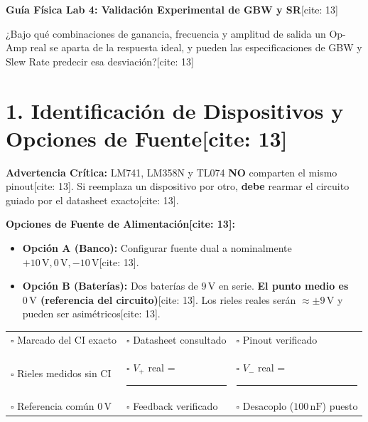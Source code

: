 \documentclass[11pt, a4paper]{article}
\begin{document}
\begin{center}
    \Large\textbf{\textcolor{ucbblue}{Guía Física Lab 4: Validación Experimental de GBW y SR}}[cite: 13]
\end{center}

\begin{tcolorbox}[colback=ucbblue!5, colframe=ucbblue, title=\textbf{Objetivo y Pregunta Experimental}]
    ¿Bajo qué combinaciones de ganancia, frecuencia y amplitud de salida un Op-Amp real se aparta de la respuesta ideal, y pueden las especificaciones de GBW y Slew Rate predecir esa desviación?[cite: 13]
\end{tcolorbox}

\section*{1. Identificación de Dispositivos y Opciones de Fuente[cite: 13]}
\begin{sloppypar}
\textbf{Advertencia Crítica:} LM741, LM358N y TL074 \textbf{NO} comparten el mismo pinout[cite: 13]. Si reemplaza un dispositivo por otro, \textbf{debe} rearmar el circuito guiado por el datasheet exacto[cite: 13].
\end{sloppypar}

\vspace{0.2cm}
\textbf{Opciones de Fuente de Alimentación[cite: 13]:}
\begin{itemize}
    \item \textbf{Opción A (Banco):} Configurar fuente dual a nominalmente $+10\,\text{V}, 0\,\text{V}, -10\,\text{V}$[cite: 13].
    \item \textbf{Opción B (Baterías):} Dos baterías de $9\,\text{V}$ en serie. \textbf{El punto medio es $0\,\text{V}$ (referencia del circuito)}[cite: 13]. Los rieles reales serán $\approx \pm 9\,\text{V}$ y pueden ser asimétricos[cite: 13].
\end{itemize}

\begin{tcolorbox}[colback=white, colframe=black, title=\textbf{Pre-Power Checklist}]
    \begin{tabularx}{\textwidth}{X X X}
    $\square$ Marcado del CI exacto & $\square$ Datasheet consultado & $\square$ Pinout verificado \\
    $\square$ Rieles medidos sin CI & $\square$ $V_+$ real = \rule{1.5cm}{0.4pt} & $\square$ $V_-$ real = \rule{1.5cm}{0.4pt} \\
    $\square$ Referencia común $0\,\text{V}$ & $\square$ Feedback verificado & $\square$ Desacoplo ($100\,\text{nF}$) puesto \\
    \end{tabularx}
\end{tcolorbox}
\end{document}
